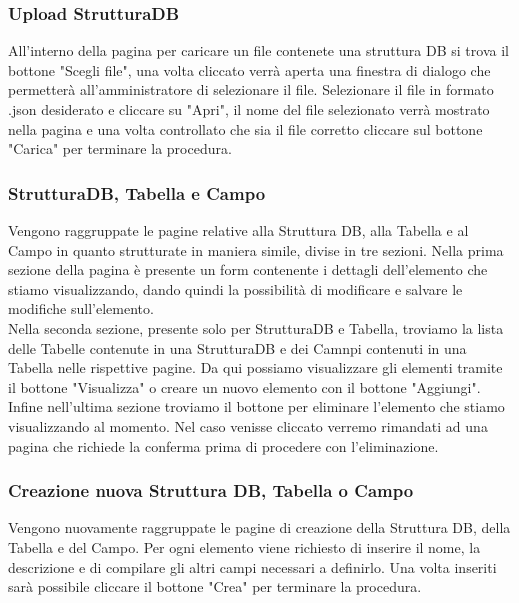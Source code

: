 \documentclass[5pt]{article}
\begin{document}
	    \subsubsection{Upload StrutturaDB}
	    All'interno della pagina per caricare un file contenete una struttura DB si trova il bottone "Scegli file", una volta cliccato verrà aperta una finestra di dialogo che permetterà all'amministratore di selezionare il file. Selezionare il file in formato .json desiderato e cliccare su "Apri", il nome del file selezionato verrà mostrato nella pagina e una volta controllato che sia il file corretto cliccare sul bottone "Carica" per terminare la procedura.
	    
	    \subsubsection{StrutturaDB, Tabella e Campo}
	    Vengono raggruppate le pagine relative alla Struttura DB, alla Tabella e al Campo in quanto strutturate in maniera simile, divise in tre sezioni. Nella prima sezione della pagina è presente un form contenente i dettagli dell'elemento che stiamo visualizzando, dando quindi la possibilità di modificare e salvare le modifiche sull'elemento.\\
	    Nella seconda sezione, presente solo per StrutturaDB e Tabella, troviamo la lista delle Tabelle contenute in una StrutturaDB e dei Camnpi contenuti in una Tabella nelle rispettive pagine. Da qui possiamo visualizzare gli elementi tramite il bottone "Visualizza" o creare un nuovo elemento con il bottone "Aggiungi".\\
	    Infine nell'ultima sezione troviamo il bottone per eliminare l'elemento che stiamo visualizzando al momento. Nel caso venisse cliccato verremo rimandati ad una pagina che richiede la conferma prima di procedere con l'eliminazione.
	    
	    \subsubsection{Creazione nuova Struttura DB, Tabella o Campo}
	    Vengono nuovamente raggruppate le pagine di creazione della Struttura DB, della Tabella e del Campo. Per ogni elemento viene richiesto di inserire il nome, la descrizione e di compilare gli altri campi necessari a definirlo. Una volta inseriti sarà possibile cliccare il bottone "Crea" per terminare la procedura.
	    
\end{document}
